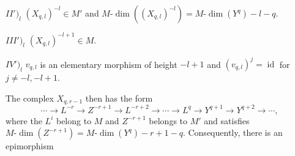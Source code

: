 \noindent$II')_l$
$(X_{q,l})^{-l}\in M'$ and
$M\text{-}\dim((X_{q,l})^{-l})=M\text{-}\dim(Y^q)-l-q$.

\noindent$III')_l$
$(X_{q,l})^{-l+1}\in M$.

\noindent$IV')_l$
$v_{q,l}$ is an elementary morphism of height $-l+1$ and
$(v_{q,l})^j=\operatorname{id}$ for $j\neq-l,-l+1$.

The complex $X_{q,r-1}$ then has the form
\[
\cdots\longrightarrow L^{-r}\longrightarrow Z^{-r+1}
\longrightarrow L^{-r+2}\longrightarrow\cdots\longrightarrow L^q
\longrightarrow Y^{q+1}\longrightarrow Y^{q+2}\longrightarrow\cdots,
\]
where the $L^i$ belong to $M$ and $Z^{-r+1}$ belongs to $M'$ and satisfies
$M\text{-}\dim(Z^{-r+1})=M\text{-}\dim(Y^q)-r+1-q$. Consequently,
there is an epimorphism
\endgroup

